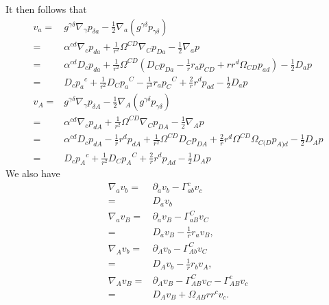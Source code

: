 \documentclass[12pt]{report}
\begin{document}
It then follows that
\begin{subequations}
\begin{align}
    v_a
    =&
    g^{\gamma\delta}\nabla_{\gamma}p_{\delta a}
    -
    \frac{1}{2}\nabla_a\left(g^{\gamma\delta}p_{\gamma\delta}\right)
    \nonumber\\
    =&
    \alpha^{cd}\nabla_{c}p_{da}
    +
    \frac{1}{r^2}\Omega^{CD}\nabla_{C}p_{Da}
    -
    \frac{1}{2}\nabla_ap
    \nonumber\\
    =&
    \alpha^{cd}D_{c}p_{da}
    +
    \frac{1}{r^2}\Omega^{CD}
    \left(
        D_Cp_{Da}
        -
        \frac{1}{r}r_ap_{CD}
        +
        rr^d\Omega_{CD}p_{ad}
    \right)
    -
    \frac{1}{2}D_ap
    \nonumber\\
    =&
    D_{c}p_{a}{}^c
    +
    \frac{1}{r^2}D_Cp_{a}{}^C
    -
    \frac{1}{r^3}r_ap_{C}{}^C
    +
    \frac{2}{r}r^dp_{ad}
    -
    \frac{1}{2}D_ap
    \\
    v_A
    =&
    g^{\gamma\delta}\nabla_{\gamma}p_{\delta A}
    -
    \frac{1}{2}\nabla_A\left(g^{\gamma\delta}p_{\gamma\delta}\right)
    \nonumber\\
    =&
    \alpha^{cd}\nabla_{c}p_{d A}
    +
    \frac{1}{r^2}\Omega^{CD}\nabla_{C}p_{D A}
    -
    \frac{1}{2}\nabla_Ap
    \nonumber\\
    =&
    \alpha^{cd}D_{c}p_{d A}
    -
    \frac{1}{r}r^dp_{d A}
    +
    \frac{1}{r^2}\Omega^{CD}D_{C}p_{D A}
    +
    \frac{2}{r}r^d\Omega^{CD}\Omega_{C(D}p_{A)d}
    -
    \frac{1}{2}D_Ap
    \nonumber\\
    =&
    D_{c}p_{A}{}^c
    +
    \frac{1}{r^2}D_{C}p_{A}{}^C
    +
    \frac{2}{r}r^dp_{Ad}
    -
    \frac{1}{2}D_Ap
\end{align}
\end{subequations}
We also have
\begin{subequations}
\begin{align}
    \nabla_av_b
    =&
    \partial_av_b
    -
    \Gamma^c_{ab}v_c
    \nonumber\\
    =&
    D_av_b
    \\
    \nabla_av_B
    =&
    \partial_av_B
    -
    \Gamma^C_{aB}v_C
    \nonumber\\
    =&
    D_av_B
    -
    \frac{1}{r}r_av_B
    ,\\
    \nabla_Av_b
    =&
    \partial_Av_b
    -
    \Gamma^C_{Ab}v_C
    \nonumber\\
    =&
    D_Av_b
    -
    \frac{1}{r}r_bv_A
    ,\\
    \nabla_Av_B
    =&
    \partial_Av_B
    -
    \Gamma^C_{AB}v_C
    -
    \Gamma^c_{AB}v_c
    \nonumber\\
    =&
    D_Av_B
    +
    \Omega_{AB} r r^cv_c
    .
\end{align}
\end{subequations}
\end{document}
